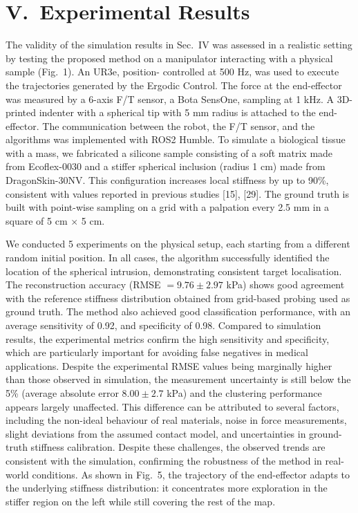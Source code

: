 \documentclass[11pt]{article}
\begin{document}
\section*{V.\ Experimental Results}

The validity of the simulation results in Sec.~IV was assessed in a
realistic setting by testing the proposed method on a manipulator
interacting with a physical sample (Fig.~1). An UR3e, position-%
controlled at 500 Hz, was used to execute the trajectories generated
by the Ergodic Control. The force at the end-effector was measured
by a 6-axis F/T sensor, a Bota SensOne, sampling at 1 kHz. A 3D-%
printed indenter with a spherical tip with 5 mm radius is attached
to the end-effector. The communication between the robot, the F/T
sensor, and the algorithms was implemented with ROS2 Humble. To
simulate a biological tissue with a mass, we fabricated a silicone
sample consisting of a soft matrix made from Ecoflex-0030 and a
stiffer spherical inclusion (radius 1 cm) made from DragonSkin-30NV.
This configuration increases local stiffness by up to 90\%,
consistent with values reported in previous studies [15], [29]. The
ground truth is built with point-wise sampling on a grid with a
palpation every 2.5 mm in a square of 5 cm $\times$ 5 cm.

We conducted 5 experiments on the physical setup, each starting from
a different random initial position. In all cases, the algorithm
successfully identified the location of the spherical intrusion,
demonstrating consistent target localisation. The reconstruction
accuracy (RMSE $= 9.76 \pm 2.97$ kPa) shows good agreement with the
reference stiffness distribution obtained from grid-based probing
used as ground truth. The method also achieved good classification
performance, with an average sensitivity of 0.92, and specificity of
0.98. Compared to simulation results, the experimental metrics
confirm the high sensitivity and specificity, which are particularly
important for avoiding false negatives in medical applications.
Despite the experimental RMSE values being marginally higher than
those observed in simulation, the measurement uncertainty is still
below the 5\% (average absolute error $8.00 \pm 2.7$ kPa) and the
clustering performance appears largely unaffected. This difference
can be attributed to several factors, including the non-ideal
behaviour of real materials, noise in force measurements, slight
deviations from the assumed contact model, and uncertainties in
ground-truth stiffness calibration. Despite these challenges, the
observed trends are consistent with the simulation, confirming the
robustness of the method in real-world conditions. As shown in
Fig.~5, the trajectory of the end-effector adapts to the underlying
stiffness distribution: it concentrates more exploration in the
stiffer region on the left while still covering the rest of the map.
\end{document}
